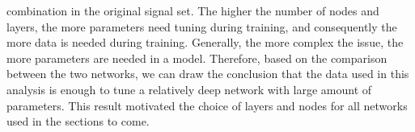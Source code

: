 combination in the original signal set. The higher the number of nodes and layers, the more parameters need tuning during training, 
and consequently the more data is needed during training. Generally, the more complex the issue, the more parameters are needed in a model. Therefore, 
based on the comparison between the two networks, we can draw the conclusion that the data used in this analysis is enough to tune a relatively 
deep network with large amount of parameters. This result motivated the choice of layers and nodes for all networks used in the sections to come.
\begin{figure}
\end{figure}
